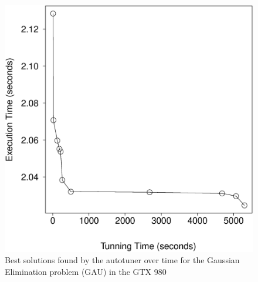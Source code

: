 \begin{figure}[htpb]
\begin{minipage}{.48\textwidth}
        \includegraphics[scale=.22]{./images/gaussian-0-GTX-980-Best.eps}
        \caption{Best solutions found by the autotuner over time for the Gaussian Elimination problem (GAU) in the GTX 980}
        \label{fig:980gauBest}
    \end{minipage}%


\end{figure}

